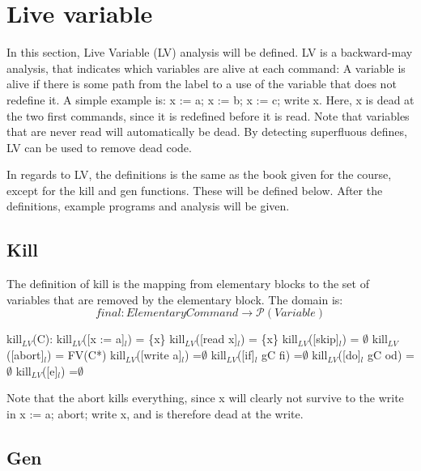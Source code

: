 
\section{Live variable}

In this section, Live Variable (LV) analysis will be defined.
LV is a backward-may analysis, that indicates which variables are
alive at each command: A variable is alive if there is some path
from the label to a use of the variable that does not redefine it.
A simple example is: x := a; x := b; x := c; write x.
Here, x is dead at the two first commands, since it is redefined
before it is read. Note that variables that are never read will
automatically be dead. By detecting superfluous defines, LV
can be used to remove dead code.

In regards to LV, the definitions is the same as the book given for the course,
except for the kill and gen functions. These will be defined below.
After the definitions, example programs and analysis will be given.

\subsection{Kill}

The definition of kill is the mapping from elementary blocks to the set of variables
that are removed by the elementary block. The domain is:
\[final \colon Elementary Command \to \mathcal{P}(Variable)\]

kill$_{LV}$(C):\newline
kill$_{LV}$([x := a]$_l$)           = \{x\}
kill$_{LV}$([read x]$_l$)           = \{x\}
kill$_{LV}$([skip]$_l$)             = $\emptyset$\newline
kill$_{LV}$([abort]$_l$) 			= FV(C*)\newline
kill$_{LV}$([write a]$_l$)          =$\emptyset$\newline
kill$_{LV}$([if]$_l$ gC fi)         =$\emptyset$\newline
kill$_{LV}$([do]$_l$ gC od)         =$\emptyset$\newline
kill$_{LV}$([e]$_l$)                =$\emptyset$\newline

Note that the abort kills everything, since x will clearly not survive to the write in
x := a; abort; write x, and is therefore dead at the write.

\subsection{Gen}

